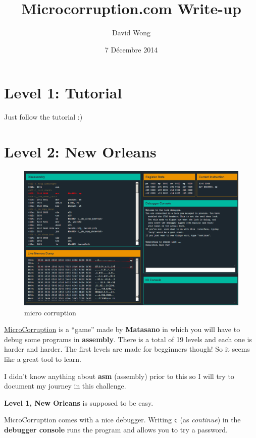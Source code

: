 \documentclass[a4paper,11pt]{article}
\title{Microcorruption.com Write-up}
\author{David Wong}
\date{7 Décembre 2014}
\begin{document}
\maketitle

\section{Level 1: Tutorial}\label{level-1-tutorial}

Just follow the tutorial :)

\section{Level 2: New Orleans}\label{level-2-new-orleans}

\begin{figure}[htbp]
\centering
\includegraphics{img/1_1.png}
\caption{micro corruption}
\end{figure}

\href{http://microcorruption.com/}{MicroCorruption} is a ``game'' made
by \textbf{Matasano} in which you will have to debug some programs in
\textbf{assembly}. There is a total of 19 levels and each one is harder
and harder. The first levels are made for begginners though! So it seems
like a great tool to learn.

I didn't know anything about \textbf{asm} (assembly) prior to this so I
will try to document my journey in this challenge.

\textbf{Level 1, New Orleans} is supposed to be easy.

MicroCorruption comes with a nice debugger. Writing \texttt{c} (as
\emph{continue}) in the \textbf{debugger console} runs the program and
allows you to try a password.
\end{document}
